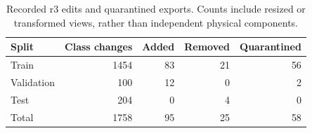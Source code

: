 \begin{table}[!t]
\centering
\caption{Recorded r3 edits and quarantined exports. Counts include resized or
transformed views, rather than independent physical components.}
\label{tab:review}
\footnotesize\setlength{\tabcolsep}{4pt}
\begin{tabular}{lrrrr}
\toprule
Split & Class changes & Added & Removed & Quarantined\\
\midrule
Train & 1454 & 83 & 21 & 56\\
Validation & 100 & 12 & 0 & 2\\
Test & 204 & 0 & 4 & 0\\
\midrule
Total & 1758 & 95 & 25 & 58\\
\bottomrule
\end{tabular}
\end{table}
